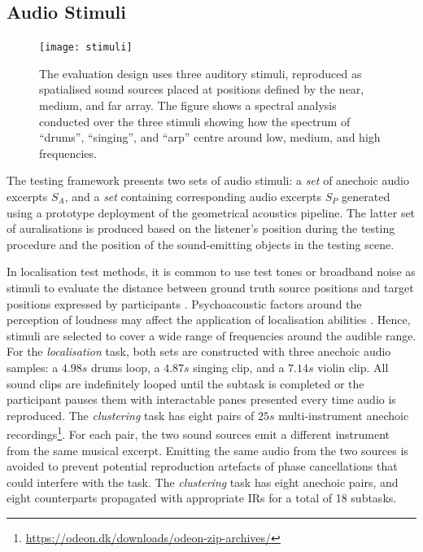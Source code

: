 \subsection{Audio Stimuli}
\begin{figure}[htbp]
    \centering
    \texttt{[image: stimuli]}
    \caption{The evaluation design uses three auditory stimuli, reproduced as spatialised sound sources placed at positions defined by the near, medium, and far array. The figure shows a spectral analysis conducted over the three stimuli showing how the spectrum of ``drums'', ``singing'', and ``arp'' centre around low, medium, and high frequencies.}
    \label{fig:stimuli}
\end{figure}
The testing framework presents two sets of audio stimuli: a \emph{set} of anechoic audio excerpts $S_A$, and a \emph{set} containing corresponding audio excerpts $S_P$ generated using a prototype deployment of the geometrical acoustics pipeline. The latter set of auralisations is produced based on the listener's position during the testing procedure and the position of the sound-emitting objects in the testing scene. \par
In localisation test methods, it is common to use test tones or broadband noise as stimuli to evaluate the distance between ground truth source positions and target positions expressed by participants \citep{bertet2013investigation, kashino1998adaptation}. Psychoacoustic factors around the perception of loudness may affect the application of localisation abilities \citep{blauert1997spatial}. Hence, stimuli are selected to cover a wide range of frequencies around the audible range.
For the \emph{localisation} task, both sets are constructed with three anechoic audio samples: a $4.98s$ drums loop, a $4.87s$ singing clip, and a $7.14s$ violin clip. All sound clips are indefinitely looped until the subtask is completed or the participant pauses them with interactable panes presented every time audio is reproduced.
The \emph{clustering} task has eight pairs of $25s$ multi-instrument anechoic recordings\footnote{\url{https://odeon.dk/downloads/odeon-zip-archives/}}. For each pair, the two sound sources emit a different instrument from the same musical excerpt. Emitting the same audio from the two sources is avoided to prevent potential reproduction artefacts of phase cancellations that could interfere with the task. The \emph{clustering} task has eight anechoic pairs, and eight counterparts propagated with appropriate IRs for a total of 18 subtasks.

